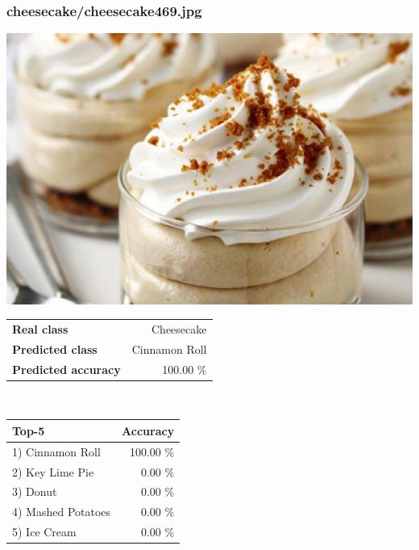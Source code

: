 \subsubsection{cheesecake/cheesecake469.jpg}

\begin{minipage}[t]{0.4\textwidth}
	\vspace{0pt}
	\includegraphics[width=\linewidth]{images/evaluation-images/cheesecake/cheesecake469.jpg}
\end{minipage}
\hfill
\begin{minipage}[t]{0.5\textwidth}
	\vspace{0pt}\raggedright
	\begin{tabularx}{\textwidth}{X r}
		\small \textbf{Real class} & \small Cheesecake\\
		\small \textbf{Predicted class} & \small Cinnamon Roll\\
		\small \textbf{Predicted accuracy} & \small 100.00 \%
    \end{tabularx}\\
    
    \vspace{6pt}
	\begin{tabularx}{\textwidth}{X r}
        \small \textbf{Top-5} & \small \textbf{Accuracy} \\
        \hline
		\small 1) Cinnamon Roll & \small 100.00 \%\\\small 2) Key Lime Pie & \small 0.00 \%\\\small 3) Donut & \small 0.00 \%\\\small 4) Mashed Potatoes & \small 0.00 \%\\\small 5) Ice Cream & \small 0.00 \%
    \end{tabularx}
\end{minipage}
    
